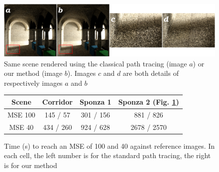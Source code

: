 \begin{figure}[t]
\begin{center}
\includegraphics[scale=0.17]{images/four_scenes_for_dgci.png}
\caption{\label{fig:results}Same scene rendered using the classical path tracing (image $a$) or our method (image $b$). Images $c$ and $d$ are both details of respectively images $a$ and $b$ }
\end{center}
\end{figure}

\begin{figure}[tb]
\centering
\begin{tabular}{|c|c|c|c|}
\hline
Scene & Corridor & Sponza 1 & Sponza 2 (Fig. \ref{fig:results}) \\
\hline
MSE 100& 145 / 57 & 301 / 156 & 881 / 826 \\
\hline
MSE 40& 434 / 260 & 924 / 628 & 2678 / 2570 \\
\hline
\end{tabular}
\caption{Time (s) to reach an MSE of 100 and 40 against reference images. In each cell, the left number is for the standard path tracing, the right is for our method}
\label{tab:timing}
\end{figure}